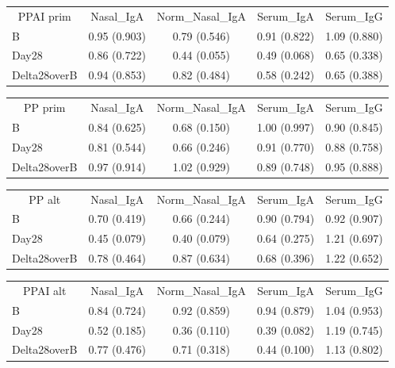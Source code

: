 \documentclass[
]{article}
\begin{document}
\begin{tabular}{>{}l|>{}c|>{}c|>{}c|c}
\hline
\multicolumn{1}{c|}{PPAI prim} & \multicolumn{1}{c|}{Nasal\_IgA} & \multicolumn{1}{c|}{Norm\_Nasal\_IgA} & \multicolumn{1}{c|}{Serum\_IgA} & \multicolumn{1}{c}{Serum\_IgG} \\
\cline{1-1} \cline{2-2} \cline{3-3} \cline{4-4} \cline{5-5}
B & 0.95 (0.903) & 0.79 (0.546) & 0.91 (0.822) & 1.09 (0.880)\\
\hline
Day28 & 0.86 (0.722) & 0.44 (0.055) & 0.49 (0.068) & 0.65 (0.338)\\
\hline
Delta28overB & 0.94 (0.853) & 0.82 (0.484) & 0.58 (0.242) & 0.65 (0.388)\\
\hline
\end{tabular}

\begin{tabular}{>{}l|>{}c|>{}c|>{}c|c}
\hline
\multicolumn{1}{c|}{PP prim} & \multicolumn{1}{c|}{Nasal\_IgA} & \multicolumn{1}{c|}{Norm\_Nasal\_IgA} & \multicolumn{1}{c|}{Serum\_IgA} & \multicolumn{1}{c}{Serum\_IgG} \\
\cline{1-1} \cline{2-2} \cline{3-3} \cline{4-4} \cline{5-5}
B & 0.84 (0.625) & 0.68 (0.150) & 1.00 (0.997) & 0.90 (0.845)\\
\hline
Day28 & 0.81 (0.544) & 0.66 (0.246) & 0.91 (0.770) & 0.88 (0.758)\\
\hline
Delta28overB & 0.97 (0.914) & 1.02 (0.929) & 0.89 (0.748) & 0.95 (0.888)\\
\hline
\end{tabular}

\begin{tabular}{>{}l|>{}c|>{}c|>{}c|c}
\hline
\multicolumn{1}{c|}{PP alt} & \multicolumn{1}{c|}{Nasal\_IgA} & \multicolumn{1}{c|}{Norm\_Nasal\_IgA} & \multicolumn{1}{c|}{Serum\_IgA} & \multicolumn{1}{c}{Serum\_IgG} \\
\cline{1-1} \cline{2-2} \cline{3-3} \cline{4-4} \cline{5-5}
B & 0.70 (0.419) & 0.66 (0.244) & 0.90 (0.794) & 0.92 (0.907)\\
\hline
Day28 & 0.45 (0.079) & 0.40 (0.079) & 0.64 (0.275) & 1.21 (0.697)\\
\hline
Delta28overB & 0.78 (0.464) & 0.87 (0.634) & 0.68 (0.396) & 1.22 (0.652)\\
\hline
\end{tabular}

\begin{tabular}{>{}l|>{}c|>{}c|>{}c|c}
\hline
\multicolumn{1}{c|}{PPAI alt} & \multicolumn{1}{c|}{Nasal\_IgA} & \multicolumn{1}{c|}{Norm\_Nasal\_IgA} & \multicolumn{1}{c|}{Serum\_IgA} & \multicolumn{1}{c}{Serum\_IgG} \\
\cline{1-1} \cline{2-2} \cline{3-3} \cline{4-4} \cline{5-5}
B & 0.84 (0.724) & 0.92 (0.859) & 0.94 (0.879) & 1.04 (0.953)\\
\hline
Day28 & 0.52 (0.185) & 0.36 (0.110) & 0.39 (0.082) & 1.19 (0.745)\\
\hline
Delta28overB & 0.77 (0.476) & 0.71 (0.318) & 0.44 (0.100) & 1.13 (0.802)\\
\hline
\end{tabular}
\end{document}
